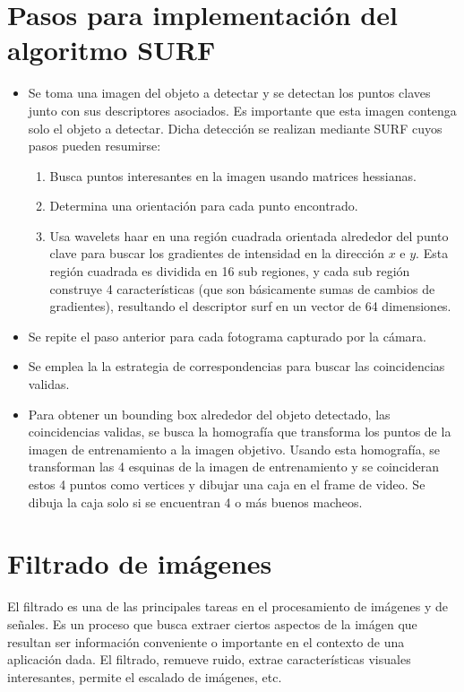 \section{Pasos para implementación del algoritmo SURF}
\begin{itemize}
 \item Se toma una imagen del objeto a detectar y se detectan los puntos claves junto con sus descriptores asociados. Es importante que esta imagen contenga solo el objeto a detectar. Dicha detección se realizan mediante SURF cuyos pasos pueden resumirse:%
  \begin{enumerate}
    \item Busca puntos interesantes en la imagen usando matrices hessianas.
    \item Determina una orientación para cada punto encontrado.
    \item Usa wavelets haar en una región cuadrada orientada alrededor del punto clave para buscar los gradientes de intensidad en la dirección $x$ e $y$. Esta región cuadrada es dividida en 16 sub regiones, y cada sub región construye 4 características (que son básicamente sumas de cambios de gradientes), resultando el descriptor surf en un vector de 64 dimensiones.
  \end{enumerate}
 \item Se repite el paso anterior para cada fotograma capturado por la cámara.
 \item Se emplea la la estrategia de correspondencias para buscar las coincidencias validas.
 \item Para obtener un bounding box alrededor del objeto detectado, las coincidencias validas, se busca la homografía que transforma los puntos de la imagen de entrenamiento a la imagen objetivo. Usando esta homografía, se transforman las 4 esquinas de la imagen de entrenamiento y se coincideran estos 4 puntos como vertices y dibujar una caja en el frame de video. Se dibuja la caja solo si se encuentran 4 o más buenos macheos.
\end{itemize}

\section{Filtrado de imágenes}
El filtrado es una de las principales tareas en el procesamiento de imágenes y de señales. Es un proceso que busca extraer ciertos aspectos de la imágen que resultan ser información conveniente o importante en el contexto de una aplicación dada. El filtrado, remueve ruido, extrae características visuales interesantes, permite el escalado de imágenes, etc.

